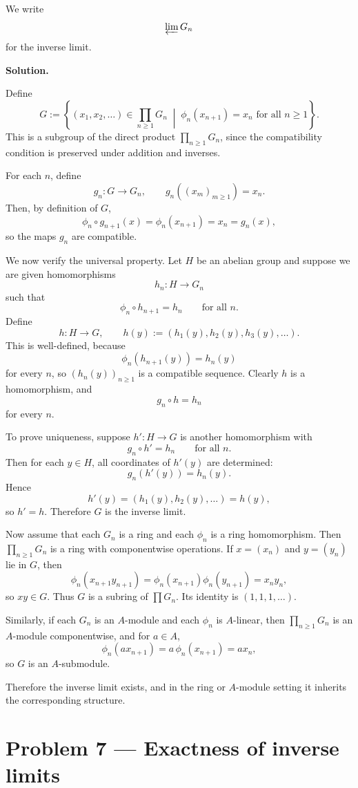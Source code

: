 \documentclass[12pt,a4paper]{article}
\theoremstyle{plain}
\theoremstyle{definition}      %
\begin{document}
We write
\[
\varprojlim G_n
\]
for the inverse limit.

\bigskip
\textbf{Solution.}

Define
\[
G:=\left\{(x_1,x_2,\dots)\in \prod_{n\ge1}G_n \;\middle|\; \phi_n(x_{n+1})=x_n \text{ for all }n\ge1\right\}.
\]
This is a subgroup of the direct product \(\prod_{n\ge1}G_n\), since the compatibility condition is preserved under addition and inverses.

For each \(n\), define
\[
g_n:G\to G_n,\qquad g_n((x_m)_{m\ge1})=x_n.
\]
Then, by definition of \(G\),
\[
\phi_n\circ g_{n+1}(x)=\phi_n(x_{n+1})=x_n=g_n(x),
\]
so the maps \(g_n\) are compatible.

We now verify the universal property. Let \(H\) be an abelian group and suppose we are given homomorphisms
\[
h_n:H\to G_n
\]
such that
\[
\phi_n\circ h_{n+1}=h_n
\qquad \text{for all }n.
\]
Define
\[
h:H\to G,\qquad h(y):=(h_1(y),h_2(y),h_3(y),\dots).
\]
This is well-defined, because
\[
\phi_n(h_{n+1}(y))=h_n(y)
\]
for every \(n\), so \((h_n(y))_{n\ge1}\) is a compatible sequence. Clearly \(h\) is a homomorphism, and
\[
g_n\circ h = h_n
\]
for every \(n\).

To prove uniqueness, suppose \(h':H\to G\) is another homomorphism with
\[
g_n\circ h' = h_n
\qquad\text{for all }n.
\]
Then for each \(y\in H\), all coordinates of \(h'(y)\) are determined:
\[
g_n(h'(y))=h_n(y).
\]
Hence
\[
h'(y)=(h_1(y),h_2(y),\dots)=h(y),
\]
so \(h'=h\). Therefore \(G\) is the inverse limit.

\medskip
Now assume that each \(G_n\) is a ring and each \(\phi_n\) is a ring homomorphism. Then \(\prod_{n\ge1}G_n\) is a ring with componentwise operations. If \(x=(x_n)\) and \(y=(y_n)\) lie in \(G\), then
\[
\phi_n(x_{n+1}y_{n+1})
=
\phi_n(x_{n+1})\phi_n(y_{n+1})
=
x_n y_n,
\]
so \(xy\in G\). Thus \(G\) is a subring of \(\prod G_n\). Its identity is \((1,1,1,\dots)\).

Similarly, if each \(G_n\) is an \(A\)-module and each \(\phi_n\) is \(A\)-linear, then \(\prod_{n\ge1}G_n\) is an \(A\)-module componentwise, and for \(a\in A\),
\[
\phi_n(a x_{n+1})=a\,\phi_n(x_{n+1})=a x_n,
\]
so \(G\) is an \(A\)-submodule.

Therefore the inverse limit exists, and in the ring or \(A\)-module setting it inherits the corresponding structure.	
	
	
\section*{Problem 7 --- Exactness of inverse limits}
\end{document}
